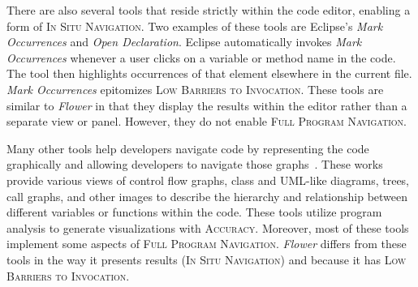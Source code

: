 \documentclass[conference]{IEEEtran}
\begin{document}
There are also several tools that reside strictly within the code editor, enabling a form of \textsc{In Situ Navigation}.
Two examples of these tools are Eclipse's \emph{Mark Occurrences} and \emph{Open Declaration}. 
Eclipse automatically invokes \emph{Mark Occurrences} whenever a user clicks on a variable or method name in the code.
The tool then highlights occurrences of that element elsewhere in the current file.
\emph{Mark Occurrences} epitomizes \textsc{Low Barriers to Invocation}.
These tools are similar to \textit{Flower} in that they display the results within the editor rather than a separate view or panel.
However, they do not enable \textsc{Full Program Navigation}.


Many other tools help developers navigate code by representing the code graphically and allowing developers to navigate those graphs~\cite{CodeBubbles,CodeCanvas,CodeSurfer,Dora,Reacher,Relo,Whyline}. 
These works provide various views of control flow graphs, class and UML-like diagrams, trees, call graphs, and other images to describe the hierarchy and relationship between different variables or functions within the code. 
These tools utilize program analysis to generate visualizations with \textsc{Accuracy}.
Moreover, most of these tools implement some aspects of \textsc{Full Program Navigation}.
\textit{Flower} differs from these tools in the way it presents results (\textsc{In Situ Navigation}) and because it has \textsc{Low Barriers to Invocation}.
\end{document}
